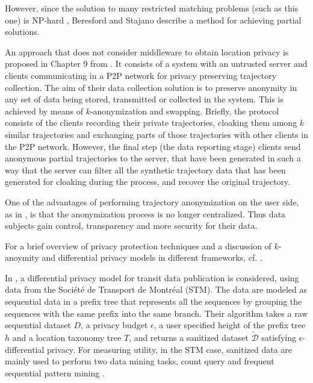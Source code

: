 \documentclass{llncs}
\begin{document}
However, since the solution to many restricted matching problems (such as this one) is NP-hard \cite{Tanimoto1978}, Beresford and Stajano \cite{Beresford04mixzones} describe a method for achieving partial solutions.


An approach that does not consider middleware to obtain location privacy is proposed in Chapter 9 from \cite{Gidofalvi2007}. It consists of a system with an untrusted server and clients communicating in a P2P network for privacy preserving trajectory collection.
The aim of their data collection solution is to preserve anonymity in any set of data being stored, transmitted or
collected in the system. This is achieved by means of $k$-anonymization and swapping.
Briefly, the protocol consists of the clients recording their private trajectories, cloaking them among $k$ similar trajectories and exchanging parts of those trajectories with other clients in the P2P network. However, the final step (the data reporting stage) clients send anonymous partial trajectories to the server, that have been generated in such a way that the server can filter all the synthetic trajectory data that has been generated for cloaking during the process, and recover the original trajectory.

One of the advantages of performing trajectory anonymization on the user side, as in \cite{Romero-Tris2016}, is that the anonymization process is no longer centralized. Thus data subjects gain control, transparency and more security for their data.


For a brief overview of privacy protection techniques and a discussion of $k$-anoymity and differential privacy models in different frameworks, cf. \cite{Salas:2018}.


In \cite{Chen:2012}, a differential privacy model for transit data publication is considered, using data from the Soci\'{e}t\'{e} de Transport de Montr\'{e}al (STM). The data are modeled as sequential data in a prefix tree that represents all the sequences by grouping the sequences with the same prefix into the same branch.
Their algorithm takes a raw sequential dataset $D$, a privacy budget $\epsilon$, a user specified height of the prefix tree $h$ and a location taxonomy tree $T$, and returns a sanitized dataset $\tilde{\mathcal{D}}$ satisfying $\epsilon$-differential privacy.
For measuring utility, in the STM case, sanitized data are mainly used to perform two
data mining tasks, count query and frequent sequential pattern mining \cite{Agrawal:1995}.
\end{document}
